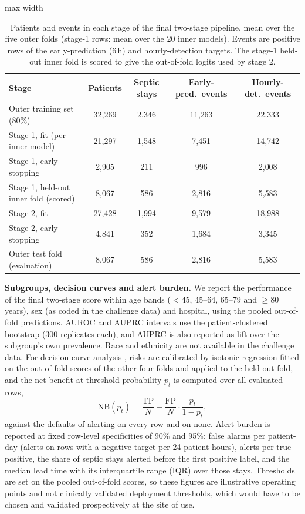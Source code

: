 \documentclass[preprint,12pt]{elsarticle}
\begin{document}
\begin{table}[!t]
\centering\footnotesize\setlength{\tabcolsep}{4pt}
\caption{Patients and events in each stage of the final two-stage pipeline, mean over the five outer folds (stage-1 rows: mean over the 20 inner models). Events are positive rows of the early-prediction (6\,h) and hourly-detection targets. The stage-1 held-out inner fold is scored to give the out-of-fold logits used by stage 2.}
\label{tab:stages}
\begin{adjustbox}{max width=\linewidth}
\begin{tabular}{lcccc}
\toprule
Stage & Patients & Septic stays & Early-pred.\ events & Hourly-det.\ events \\
\midrule
Outer training set (80\%) & 32{,}269 & 2{,}346 & 11{,}263 & 22{,}333 \\
Stage 1{,} fit (per inner model) & 21{,}297 & 1{,}548 & 7{,}451 & 14{,}742 \\
Stage 1{,} early stopping & 2{,}905 & 211 & 996 & 2{,}008 \\
Stage 1{,} held-out inner fold (scored) & 8{,}067 & 586 & 2{,}816 & 5{,}583 \\
Stage 2{,} fit & 27{,}428 & 1{,}994 & 9{,}579 & 18{,}988 \\
Stage 2{,} early stopping & 4{,}841 & 352 & 1{,}684 & 3{,}345 \\
Outer test fold (evaluation) & 8{,}067 & 586 & 2{,}816 & 5{,}583 \\
\bottomrule
\end{tabular}
\end{adjustbox}
\end{table}

\textbf{Subgroups, decision curves and alert burden.} We report the performance of the final two-stage score within age bands ($<$45, 45--64, 65--79 and $\geq$80 years), sex (as coded in the challenge data) and hospital, using the pooled out-of-fold predictions. AUROC and AUPRC intervals use the patient-clustered bootstrap (300 replicates each), and AUPRC is also reported as lift over the subgroup's own prevalence. Race and ethnicity are not available in the challenge data. For decision-curve analysis \cite{vickers2006}, risks are calibrated by isotonic regression fitted on the out-of-fold scores of the other four folds and applied to the held-out fold, and the net benefit at threshold probability $p_t$ is computed over all evaluated rows,
\begin{equation}
\mathrm{NB}(p_t)=\frac{\mathrm{TP}}{N}-\frac{\mathrm{FP}}{N}\cdot\frac{p_t}{1-p_t},
\end{equation}
against the defaults of alerting on every row and on none. Alert burden is reported at fixed row-level specificities of 90\% and 95\%: false alarms per patient-day (alerts on rows with a negative target per 24 patient-hours), alerts per true positive, the share of septic stays alerted before the first positive label, and the median lead time with its interquartile range (IQR) over those stays. Thresholds are set on the pooled out-of-fold scores, so these figures are illustrative operating points and not clinically validated deployment thresholds, which would have to be chosen and validated prospectively at the site of use.
\end{document}
